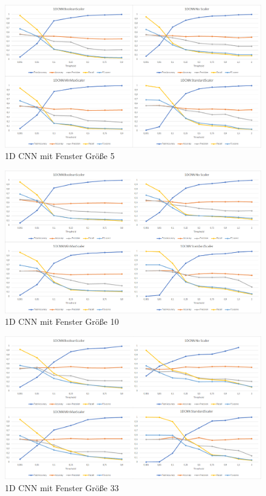 \documentclass[12pt,a4paper]{scrartcl}
\numberwithin{equation}{section}
\begin{document}
 \newpage
\thispagestyle{plain}

\begin{figure}[ht!]
	\centering
	  \includegraphics[scale=0.5]{1DCNN_5.png}
	  \caption{1D CNN mit Fenster Größe 5}
	\label{1DCNN_20}
\end{figure}

\thispagestyle{plain}

\begin{figure}[ht!]
	\centering
	  \includegraphics[scale=0.5]{1DCNN_10.png}
	  \caption{1D CNN mit Fenster Größe 10}
	\label{1DCNN_20}
\end{figure}
 \newpage
\thispagestyle{plain}

\begin{figure}[ht!]
	\centering
	  \includegraphics[scale=0.5]{1DCNN_33.png}
	  \caption{1D CNN mit Fenster Größe 33}
	\label{1DCNN_20}
\end{figure}
\end{document}
